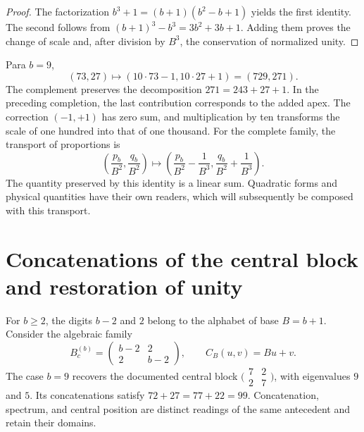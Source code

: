 \begin{proof}
The factorization \(b^3+1=(b+1)(b^2-b+1)\) yields the first
identity. The second follows from
\((b+1)^3-b^3=3b^2+3b+1\). Adding them proves the change of scale and,
after division by \(B^3\), the conservation of normalized unity.
\end{proof}

Para \(b=9\),
\begin{equation}
 (73,27)\longmapsto(10\cdot73-1,10\cdot27+1)=(729,271).
 \label{x_reciprocidad:lib03:caso-729}
\end{equation}
The complement preserves the decomposition \(271=243+27+1\). In the
preceding completion, the last contribution corresponds to the added
apex. The correction \((-1,+1)\) has zero sum, and multiplication
by ten transforms the scale of one hundred into that of one thousand. For the complete
family, the transport of proportions is
\begin{equation}
 \left(\frac{p_b}{B^2},\frac{q_b}{B^2}\right)
 \longmapsto
 \left(\frac{p_b}{B^2}-\frac1{B^3},
       \frac{q_b}{B^2}+\frac1{B^3}\right).
 \label{x_reciprocidad:lib03:fracciones-completacion}
\end{equation}
The quantity preserved by this identity is a linear sum. Quadratic
forms and physical quantities have their own readers, which will
subsequently be composed with this transport.

\section{Concatenations of the central block and restoration of unity}
\label{x_reciprocidad:lib03:centro}

For \(b\geq2\), the digits \(b-2\) and \(2\) belong to the alphabet of
base \(B=b+1\). Consider the algebraic family
\begin{equation}
 B_c^{(b)}=\begin{pmatrix}b-2&2\\2&b-2\end{pmatrix},\qquad
 C_B(u,v)=Bu+v.
 \label{x_reciprocidad:lib03:bloque-central}
\end{equation}
The case \(b=9\) recovers the documented central block
\(\bigl(\begin{smallmatrix}7&2\\2&7\end{smallmatrix}\bigr)\), with
eigenvalues \(9\) and \(5\). Its concatenations satisfy
\(72+27=77+22=99\). Concatenation, spectrum, and central position are
distinct readings of the same antecedent and retain their domains.

